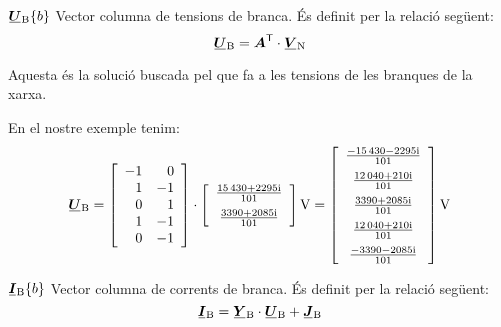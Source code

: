 \begin{list}{}
   \item[$\mcmplx{U}\ped{B}\{b\}$] Vector columna de tensions de branca. És definit per la relació següent:
   \begin{equation}
      \mcmplx{U}\ped{B} = \transpose{\boldsymbol{A}} \cdot \mcmplx{V}\ped{N} \label{eq:ur}
   \end{equation}

   Aquesta és la solució buscada pel que fa a les tensions de les branques de la xarxa.

   En el nostre exemple tenim:
   \[
      \mcmplx{U}\ped{B} =
      \begin{bmatrix}\begin{array}{rr} 
      	 -1 & 0 \\ 1  & -1 \\  0 & 1 \\ 1 & -1 \\ 0 & -1
      \end{array}\end{bmatrix} \cdot
      \begin{bmatrix}\begin{array}{c}
            \frac{\complexnum{15430 + j 2295}}{101} \\[2mm]
            \frac{\complexnum{3390 + j 2085}}{101}
      \end{array}\end{bmatrix}\unit{V} =
      \begin{bmatrix}\begin{array}{c}
           \frac{\complexnum{ -15430 - j 2295}}{101} \\[2mm]
           \frac{\complexnum{12040 + j 210}}{101}  \\[2mm]
           \frac{\complexnum{3390 + j 2085}}{101} \\[2mm]
           \frac{\complexnum{ 12040 + j 210}}{101}  \\[2mm]
           \frac{\complexnum{ -3390 - j 2085}}{101}
      \end{array}\end{bmatrix}\unit{V}
   \label{eq:ub-exemp}
   \]

   \item[$\mcmplx{I}\ped{B}\{b\}$]  Vector columna de corrents de branca. És definit per la relació següent:
   \begin{equation}
      \mcmplx{I}\ped{B} = \mcmplx{Y}\ped{B} \cdot\mcmplx{U}\ped{B} + \mcmplx{J}\ped{B} \label{eq:ir}
   \end{equation}


\end{list}
